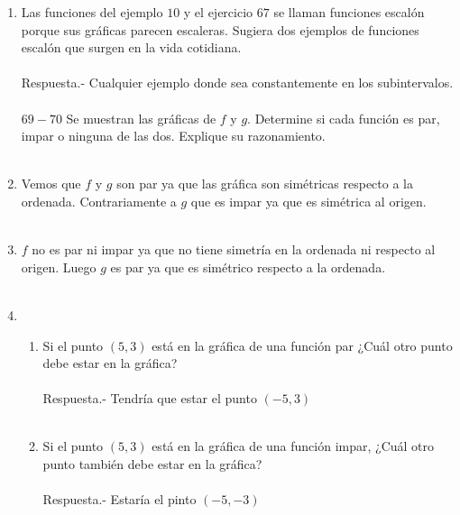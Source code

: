 \begin{enumerate}
\begin{enumerate}[\bfseries (a)]
    \end{enumerate}

    \item Las funciones del ejemplo $10$ y el ejercicio $67$ se llaman funciones escalón porque sus gráficas parecen escaleras. Sugiera dos ejemplos de funciones escalón que surgen en la vida cotidiana.\\\\
	Respuesta.-\; Cualquier ejemplo donde sea constantemente en los subintervalos.\\\\

$69-70$ Se muestran las gráficas de $f$ y $g$. Determine si cada función es par, impar o ninguna de las dos. Explique su razonamiento.\\\\

    \item Vemos que $f$ y $g$ son par ya que las gráfica son simétricas respecto a la ordenada. Contrariamente a $g$ que es impar ya que es simétrica al origen.\\\\

    \item $f$ no es par ni impar ya que no tiene simetría en la ordenada ni respecto al origen. Luego $g$ es par ya que es simétrico respecto a la ordenada.\\\\ 

    \item
    \begin{enumerate}
	
	\item Si el punto $(5,3)$ está en la gráfica de una función par ¿Cuál otro punto debe estar en la gráfica?\\\\
	    Respuesta.-\; Tendría que estar el punto $(-5,3)$\\\\

	\item Si el punto $(5,3)$ está en la gráfica de una función impar, ¿Cuál otro punto también debe estar en la gráfica?\\\\
	    Respuesta.-\; Estaría el pinto  $(-5,-3)$

    \end{enumerate}  


\end{enumerate}
